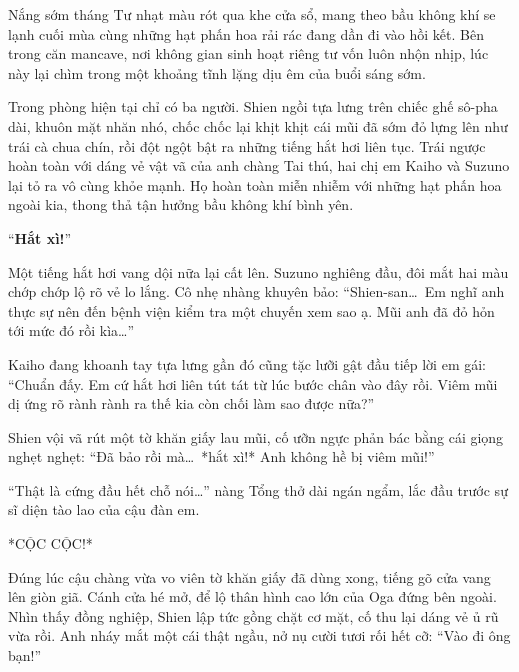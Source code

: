 \documentclass[../main.tex]{subfiles}
\begin{document}

Nắng sớm tháng Tư nhạt màu rót qua khe cửa sổ, mang theo bầu không khí se lạnh cuối mùa cùng những hạt phấn hoa rải rác đang dần đi vào hồi kết. Bên trong căn mancave, nơi không gian sinh hoạt riêng tư vốn luôn nhộn nhịp, lúc này lại chìm trong một khoảng tĩnh lặng dịu êm của buổi sáng sớm.

Trong phòng hiện tại chỉ có ba người. Shien ngồi tựa lưng trên chiếc ghế sô-pha dài, khuôn mặt nhăn nhó, chốc chốc lại khịt khịt cái mũi đã sớm đỏ lựng lên như trái cà chua chín, rồi đột ngột bật ra những tiếng hắt hơi liên tục. Trái ngược hoàn toàn với dáng vẻ vật vã của anh chàng Tai thú, hai chị em Kaiho và Suzuno lại tỏ ra vô cùng khỏe mạnh. Họ hoàn toàn miễn nhiễm với những hạt phấn hoa ngoài kia, thong thả tận hưởng bầu không khí bình yên.

``\textbf{Hắt xì!}''

Một tiếng hắt hơi vang dội nữa lại cất lên. Suzuno nghiêng đầu, đôi mắt hai màu chớp chớp lộ rõ vẻ lo lắng. Cô nhẹ nhàng khuyên bảo: ``Shien-san\dots\ Em nghĩ anh thực sự nên đến bệnh viện kiểm tra một chuyến xem sao ạ. Mũi anh đã đỏ hỏn tới mức đó rồi kìa\dots''

Kaiho đang khoanh tay tựa lưng gần đó cũng tặc lưỡi gật đầu tiếp lời em gái: ``Chuẩn đấy. Em cứ hắt hơi liên tút tát từ lúc bước chân vào đây rồi. Viêm mũi dị ứng rõ rành rành ra thế kia còn chối làm sao được nữa?''

Shien vội vã rút một tờ khăn giấy lau mũi, cố ưỡn ngực phản bác bằng cái giọng nghẹt nghẹt: ``Đã bảo rồi mà\dots\ *hắt xì!* Anh không hề bị viêm mũi!''

``Thật là cứng đầu hết chỗ nói\dots'' nàng Tổng thở dài ngán ngẩm, lắc đầu trước sự sĩ diện tào lao của cậu đàn em.

*CỘC CỘC!*

Đúng lúc cậu chàng vừa vo viên tờ khăn giấy đã dùng xong, tiếng gõ cửa vang lên giòn giã. Cánh cửa hé mở, để lộ thân hình cao lớn của Oga đứng bên ngoài. Nhìn thấy đồng nghiệp, Shien lập tức gồng chặt cơ mặt, cố thu lại dáng vẻ ủ rũ vừa rồi. Anh nháy mắt một cái thật ngầu, nở nụ cười tươi rối hết cỡ: ``Vào đi ông bạn!''
\end{document}
